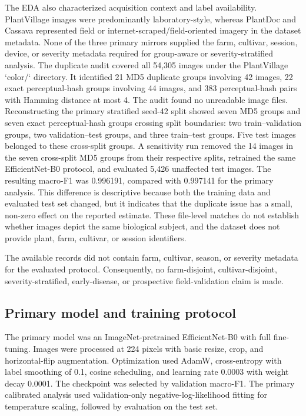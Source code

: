 \documentclass[12pt]{article}
\begin{document}
The EDA also characterized acquisition context and label availability. PlantVillage images were predominantly laboratory-style, whereas PlantDoc and Cassava represented field or internet-scraped/field-oriented imagery in the dataset metadata. None of the three primary mirrors supplied the farm, cultivar, session, device, or severity metadata required for group-aware or severity-stratified analysis. The duplicate audit covered all 54,305 images under the PlantVillage `color/` directory. It identified 21 MD5 duplicate groups involving 42 images, 22 exact perceptual-hash groups involving 44 images, and 383 perceptual-hash pairs with Hamming distance at most 4. The audit found no unreadable image files. Reconstructing the primary stratified seed-42 split showed seven MD5 groups and seven exact perceptual-hash groups crossing split boundaries: two train--validation groups, two validation--test groups, and three train--test groups. Five test images belonged to these cross-split groups. A sensitivity run removed the 14 images in the seven cross-split MD5 groups from their respective splits, retrained the same EfficientNet-B0 protocol, and evaluated 5,426 unaffected test images. The resulting macro-F1 was 0.996191, compared with 0.997141 for the primary analysis. This difference is descriptive because both the training data and evaluated test set changed, but it indicates that the duplicate issue has a small, non-zero effect on the reported estimate. These file-level matches do not establish whether images depict the same biological subject, and the dataset does not provide plant, farm, cultivar, or session identifiers.

The available records did not contain farm, cultivar, season, or severity metadata for the evaluated protocol. Consequently, no farm-disjoint, cultivar-disjoint, severity-stratified, early-disease, or prospective field-validation claim is made.

\subsection{Primary model and training protocol}
The primary model was an ImageNet-pretrained EfficientNet-B0 with full fine-tuning. Images were processed at 224 pixels with basic resize, crop, and horizontal-flip augmentation. Optimization used AdamW, cross-entropy with label smoothing of 0.1, cosine scheduling, and learning rate 0.0003 with weight decay 0.0001. The checkpoint was selected by validation macro-F1. The primary calibrated analysis used validation-only negative-log-likelihood fitting for temperature scaling, followed by evaluation on the test set.
\end{document}

